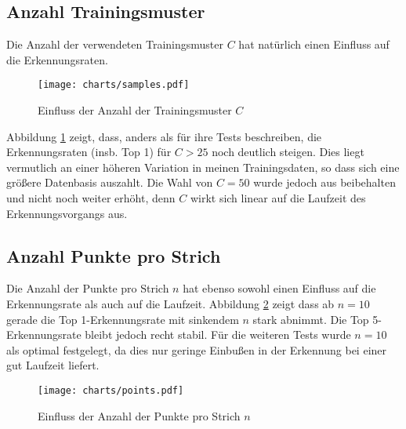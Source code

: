 \subsection{Anzahl Trainingsmuster} %
\label{sub:anzahl_trainingsmuster}

Die Anzahl der verwendeten Trainingsmuster $C$ hat natürlich einen Einfluss auf die Erkennungsraten.

\begin{figure}[htbp]
  \begin{center}
    \texttt{[image: charts/samples.pdf]}
  \end{center}
  \caption{Einfluss der Anzahl der Trainingsmuster $C$}
  \label{chart:samples}
\end{figure}

Abbildung \ref{chart:samples} zeigt, dass, anders als \citet{Golubitsky:2009p1842} für ihre Tests beschreiben, die Erkennungsraten (insb. Top 1) für $C > 25$ noch deutlich steigen. Dies liegt vermutlich an einer höheren Variation in meinen Trainingsdaten, so dass sich eine größere Datenbasis auszahlt. Die Wahl von $C=50$ wurde jedoch aus beibehalten und nicht noch weiter erhöht, denn $C$ wirkt sich linear auf die Laufzeit des Erkennungsvorgangs aus.

\subsection{Anzahl Punkte pro Strich} %
\label{sub:anzahl_punkte_pro_strich}

Die Anzahl der Punkte pro Strich $n$ hat ebenso sowohl einen Einfluss auf die Erkennungsrate als auch auf die Laufzeit. Abbildung \ref{chart:points} zeigt dass ab $n=10$ gerade die Top 1-Erkennungsrate mit sinkendem $n$ stark abnimmt. Die Top 5-Erkennungsrate bleibt jedoch recht stabil. Für die weiteren Tests wurde $n=10$ als optimal festgelegt, da dies nur geringe Einbußen in der Erkennung bei einer gut Laufzeit liefert.

\begin{figure}[htbp]
  \begin{center}
    \texttt{[image: charts/points.pdf]}
  \end{center}
  \caption{Einfluss der Anzahl der Punkte pro Strich $n$}
  \label{chart:points}
\end{figure}



